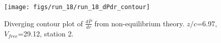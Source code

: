 \begin{figure}[H]
\centering
\texttt{[image: figs/run\_18/run\_18\_dPdr\_contour]}
\caption{Diverging contour plot of $\frac{d\bar{P}}{dr}$ from non-equilibrium theory. $z/c$=6.97, $V_{free}$=29.12, station 2.}
\label{fig:run_18_dPdr_contour}
\end{figure}


